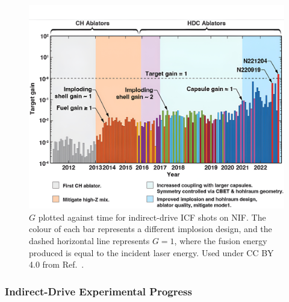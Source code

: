 \begin{figure}[t!]
    \includegraphics[width=\linewidth]{Introduction/Images/NIF_yields.jpg}
    \centering
    \caption{$G$ plotted against time for indirect-drive \ac{ICF} shots on \ac{NIF}.
    The colour of each bar represents a different implosion design, and the dashed horizontal line represents $G=1$, where the fusion energy produced is equal to the incident laser energy.
    Used under CC BY 4.0 from Ref.~\cite{abu-shawareb_achievement_2024}.
    }%
    \label{fig:intro_nif_yields}
\end{figure}

\subsubsection{Indirect-Drive Experimental Progress}%
\label{sec:intro_indirect_exp}

